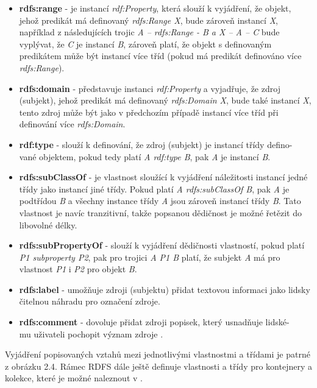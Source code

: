 \documentclass{projekt}
\begin{document}
\begin {itemize}


\item \textbf{rdfs:range} - je instancí {\it rdf:Property}, která slouží k vyjádření, že objekt, jehož predikát má definovaný {\it  rdfs:Range X}, bude zároveň instancí {\it X}, například z následujících trojic {\it A – rdfs:Range - B a X – A – C} bude vyplývat, že {\it C} je instancí {\it B}, 
zároveň platí, že objekt s definovaným predikátem může být instancí více tříd (pokud má predikát definováno více {\it  rdfs:Range}).

\item \textbf{rdfs:domain} - představuje instanci {\it rdf:Property} a vyjadřuje, že zdroj (subjekt), jehož predikát má definovaný {\it rdfs:Domain X}, bude také instancí {\it X}, tento zdroj může být jako v předchozím případě instancí více tříd při definování více {\it rdfs:Domain}.
\item \textbf{rdf:type} - slouží k definování, že zdroj (subjekt) je instancí třídy defino-\\vané objektem, pokud tedy platí {\it A rdf:type B}, pak {\it A} je instancí {\it B}.
\item \textbf{rdfs:subClassOf} - je vlastnost sloužící k vyjádření náležitosti instancí jedné třídy jako instancí jiné třídy. Pokud platí {\it A rdfs:subClassOf B}, pak {\it A} je podtřídou {\it B} a všechny instance třídy {\it A} jsou zároveň instancí třídy {\it B}. Tato vlastnost je navíc tranzitivní, takže popsanou dědičnost je možné řetězit do libovolné délky.
\item \textbf{rdfs:subPropertyOf} - slouží k vyjádření dědičnosti vlastností, pokud platí {\it P1 subproperty P2}, pak pro trojici {\it A P1 B} platí, že subjekt {\it A} má pro vlastnost {\it P1} i {\it P2} pro objekt {\it B}.
\item \textbf{rdfs:label} - umožňuje zdroji (subjektu) přidat textovou informaci jako lidsky čitelnou náhradu pro označení zdroje.
\item \textbf{rdfs:comment} - dovoluje přidat zdroji popisek, který usnadňuje lidské-\\mu uživateli pochopit význam zdroje \cite{_7}.

\end{itemize}

Vyjádření popisovaných vztahů mezi jednotlivými vlastnostmi a třídami je patrné z obrázku 2.4. Rámec RDFS dále ještě definuje vlastnosti a třídy pro kontejnery a kolekce, které je možné naleznout v \cite{_7}.
\end{document}
